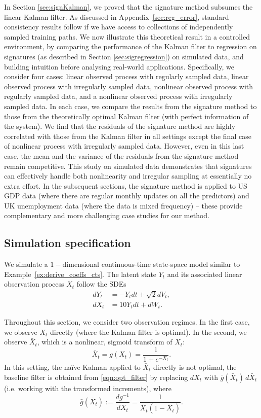 \documentclass[a4paper, 12pt]{article}
\theoremstyle{remark}
\begin{document}
In Section \ref{sec:signKalman}, we proved that the signature method subsumes the linear Kalman filter. 
As discussed in Appendix~\ref{sec:reg_error}, standard consistency results follow if we have access to collections of independently sampled training paths. 
We now illustrate this theoretical result in a controlled environment, by comparing the performance of the Kalman filter to regression on signatures (as described in Section \ref{sec:sigregression}) on simulated data, and building intuition before analysing real-world applications. Specifically, we consider four cases: linear observed process with regularly sampled data, linear observed process with irregularly sampled data, nonlinear observed process with regularly sampled data, and a nonlinear observed process with irregularly sampled data. In each case, we compare the results from the signature method to those from the theoretically optimal Kalman filter (with perfect information of the system). We find that the residuals of the signature method are highly correlated with those from the Kalman filter in all settings except the final case of nonlinear process with irregularly sampled data. However, even in this last case, the mean and the variance of the residuals from the signature method remain competitive. This study on simulated data demonstrates that signatures can effectively handle both nonlinearity and irregular sampling at essentially no extra effort. In the subsequent sections, the signature method is applied to US GDP data (where there are regular monthly updates on all the predictors) and UK unemployment data (where the data is mixed frequency) -- these provide complementary and more challenging case studies for our method. 

\subsection{Simulation specification}

We simulate a $1-$dimensional continuous-time state-space model similar to Example~\ref{ex:derive_coeffs_cts}. The latent state \(Y_t\) and its associated linear observation process \(X_t\) follow the SDEs
\begin{align*}
    dY_t &= -Y_t dt + \sqrt{2} dV_t, \\
    dX_t &= 10Y_t dt + dW_t.
\end{align*}

Throughout this section, we consider two observation regimes. In the first case, we observe \(X_t\) directly (where the Kalman filter is optimal). In the second, we observe $\bar X_t$, which is a nonlinear, sigmoid transform of \(X_t\): 
\[
    \bar X_t = g(X_t) = \frac{1}{1+e^{-X_t}}.
\]
In this setting, the na\"{i}ve Kalman applied to \(\bar{X}_t\) directly is not optimal, the baseline filter is obtained from \eqref{eqn:opt_filter} by replacing $dX_t$ with $\bar g(\bar X_t)\,d\bar X_t$ (i.e. working with the transformed increments), where
\[
    \bar g(\bar X_t) := \frac{d g^{-1}}{d\bar X_t} = \frac{1}{\bar X_t(1-\bar X_t)}.
\]
\end{document}
